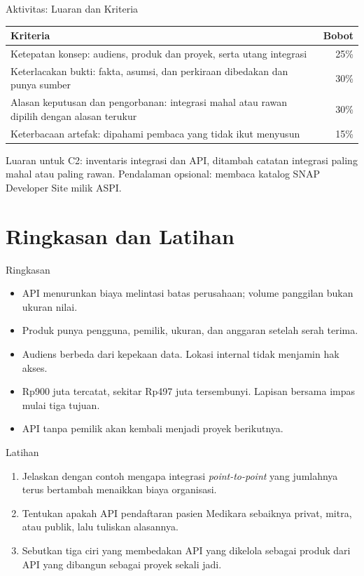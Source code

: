 \documentclass[aspectratio=169, table, 12pt]{beamer}
\begin{document}
\begin{frame}{{\Large Aktivitas: Luaran dan Kriteria}}
  \footnotesize
  \begin{tabularx}{\textwidth}{>{\raggedright\arraybackslash}X r}
    \hline
    \textbf{Kriteria} & \textbf{Bobot} \\ \hline
    Ketepatan konsep: audiens, produk dan proyek, serta utang integrasi & 25\% \\ \hline
    Keterlacakan bukti: fakta, asumsi, dan perkiraan dibedakan dan punya sumber & 30\% \\ \hline
    Alasan keputusan dan pengorbanan: integrasi mahal atau rawan dipilih dengan alasan terukur & 30\% \\ \hline
    Keterbacaan artefak: dipahami pembaca yang tidak ikut menyusun & 15\% \\ \hline
  \end{tabularx}

  \vspace{8pt}
  \small Luaran untuk C2: inventaris integrasi dan API, ditambah catatan integrasi paling mahal atau paling rawan.
  Pendalaman opsional: membaca katalog SNAP Developer Site milik ASPI.
\end{frame}

\section{Ringkasan dan Latihan}

\begin{frame}{{\Large Ringkasan}}
  \vspace{10pt}
  \begin{itemize}
    \item API menurunkan biaya melintasi batas perusahaan; volume panggilan bukan ukuran nilai.
    \item Produk punya pengguna, pemilik, ukuran, dan anggaran setelah serah terima.
    \item Audiens berbeda dari kepekaan data. Lokasi internal tidak menjamin hak akses.
    \item Rp900 juta tercatat, sekitar Rp497 juta tersembunyi. Lapisan bersama impas mulai tiga tujuan.
    \item API tanpa pemilik akan kembali menjadi proyek berikutnya.
  \end{itemize}
\end{frame}

\begin{frame}{{\Large Latihan}}
  \vspace{10pt}
  \begin{enumerate}
    \item Jelaskan dengan contoh mengapa integrasi \textit{point-to-point} yang jumlahnya terus bertambah menaikkan biaya organisasi.
    \item Tentukan apakah API pendaftaran pasien Medikara sebaiknya privat, mitra, atau publik, lalu tuliskan alasannya.
    \item Sebutkan tiga ciri yang membedakan API yang dikelola sebagai produk dari API yang dibangun sebagai proyek sekali jadi.
  \end{enumerate}
\end{frame}
\end{document}
